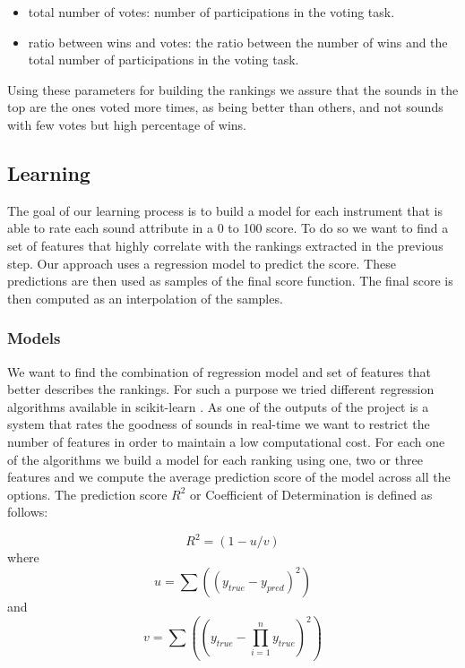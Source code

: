 \documentclass{article}
\begin{document}
\begin{itemize}
	\item{total number of votes: number of participations in the voting task.}
	\item{ratio between wins and votes: the ratio between the number of wins and the total number of participations in the voting task.}
\end{itemize}
  
Using these parameters for building the rankings we assure that the sounds in the top are the ones voted more times, as being better than others, and not sounds with few votes but high percentage of wins.

\subsection{Learning}
The goal of our learning process is to build a model for each instrument that is able to rate each sound attribute in a 0 to 100 score. To do so we want to find a set of features that highly correlate with the rankings extracted in the previous step.  
Our approach uses a regression model to predict the score. These predictions are then used as samples of the final score function. The final score is then computed as an interpolation of the samples.

\subsubsection{Models}
We want to find the combination of regression model and set of features that better describes the rankings. For such a purpose we tried different regression algorithms available in scikit-learn \cite{08}.  As one of the outputs of the project is a system that rates the goodness of sounds in real-time we want to restrict the number of features in order to maintain a low computational cost. For each one of the algorithms we build a model for each ranking using one, two or three features and we compute the average prediction score of the model across all the options. The prediction score $R^2$  or Coefficient of Determination is defined as follows:

\begin{equation}
 R^2 = (1 - u/v) 
\end{equation}
where
\begin{equation}
	u = \sum\nolimits((y_{true} - y_{pred})^2)
\end{equation}
and
\begin{equation}
	v = \sum\nolimits((y_{true} - \prod\limits_{i=1}^n y_{true})^2)
\end{equation}
\end{document}
